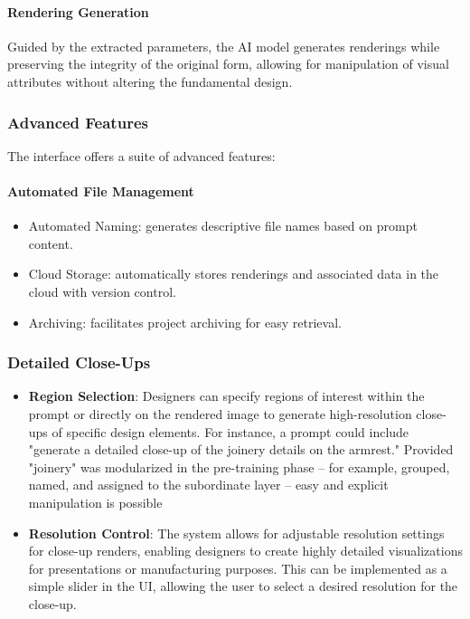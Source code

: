 \documentclass[12pt]{report}
\begin{document}
\paragraph{Rendering Generation}
Guided by the extracted parameters, the AI model generates renderings while preserving the integrity of the original form, allowing for manipulation of visual attributes without altering the fundamental design.

\subsubsection{Advanced Features}
The interface offers a suite of advanced features:

\paragraph{Automated File Management}

\begin{itemize}
    \item Automated Naming: generates descriptive file names based on prompt content.
    \item Cloud Storage: automatically stores renderings and associated data in the cloud with version control.
    \item Archiving: facilitates project archiving for easy retrieval.
\end{itemize}














\subsubsection{Detailed Close-Ups}
\begin{itemize}
\item \textbf{Region Selection}: Designers can specify regions of interest within the prompt or directly on the rendered image to generate high-resolution close-ups of specific design elements. For instance, a prompt could include "generate a detailed close-up of the joinery details on the armrest." Provided "joinery" was modularized in the pre-training phase -- for example, grouped, named, and assigned to the subordinate layer -- easy and explicit manipulation is possible
\item \textbf{Resolution Control}: The system allows for adjustable resolution settings for close-up renders, enabling designers to create highly detailed visualizations for presentations or manufacturing purposes. This can be implemented as a simple slider in the UI, allowing the user to select a desired resolution for the close-up.
\end{itemize}
\end{document}
